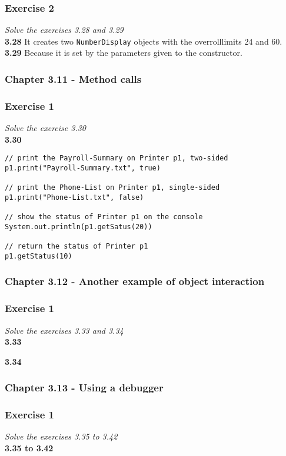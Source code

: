 \subsubsection*{Exercise 2}
\textit{Solve the exercises 3.28 and 3.29}\\

\textbf{3.28} It creates two \lstinline!NumberDisplay! objects with the 
overrolllimits 24 and 60. \\

\textbf{3.29} Because it is set by the parameters given to the constructor.

\subsubsection{Chapter 3.11 - Method calls}

\subsubsection*{Exercise 1}
\textit{Solve the exercise 3.30}\\

\textbf{3.30} 
\begin{lstlisting}
// print the Payroll-Summary on Printer p1, two-sided
p1.print("Payroll-Summary.txt", true)

// print the Phone-List on Printer p1, single-sided
p1.print("Phone-List.txt", false)

// show the status of Printer p1 on the console
System.out.println(p1.getSatus(20))

// return the status of Printer p1
p1.getStatus(10)
\end{lstlisting}

\subsubsection{Chapter 3.12 - Another example of object interaction}

\subsubsection*{Exercise 1}
\textit{Solve the exercises 3.33 and 3.34}\\

\textbf{3.33}







\textbf{3.34} 

\subsubsection{Chapter 3.13 - Using a debugger}

\subsubsection*{Exercise 1}
\textit{Solve the exercises 3.35 to 3.42}\\

\textbf{3.35 to 3.42} 



